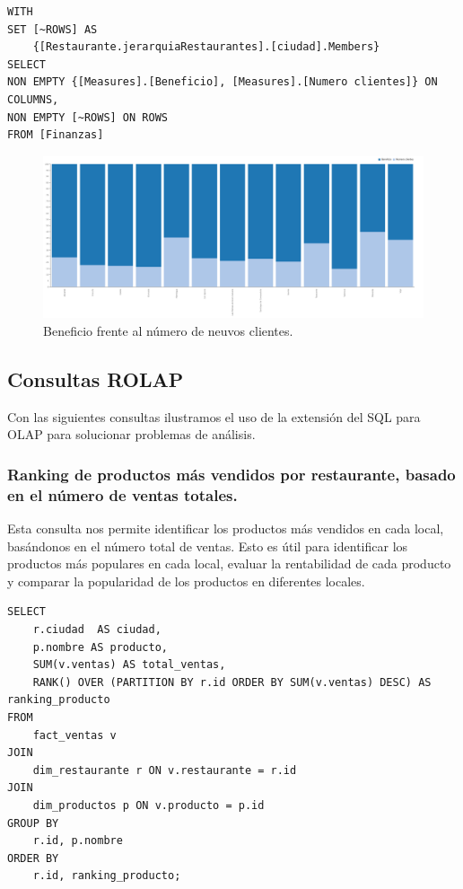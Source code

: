 \documentclass[11pt]{opticajnl}
\begin{document}
\begin{lstlisting}[style=terminal]
WITH
SET [~ROWS] AS
    {[Restaurante.jerarquiaRestaurantes].[ciudad].Members}
SELECT
NON EMPTY {[Measures].[Beneficio], [Measures].[Numero clientes]} ON COLUMNS,
NON EMPTY [~ROWS] ON ROWS
FROM [Finanzas]
\end{lstlisting}

\begin{figure}[H]
    \centering
    \includegraphics[width=\textwidth]{fotos/beneficioVsCliente.png}
    \caption{Beneficio frente al número de neuvos clientes.}
    \label{fig:consulta2}
\end{figure}









\subsection{Consultas ROLAP}

Con las siguientes consultas ilustramos el uso de la extensión del SQL para OLAP para solucionar problemas de análisis.

\subsubsection{Ranking de productos más vendidos por restaurante, basado en el número de ventas totales.}

Esta consulta nos permite identificar los productos más vendidos en cada local, basándonos en el número total de ventas. Esto es útil para identificar los productos más populares en cada local, evaluar la rentabilidad de cada producto y comparar la popularidad de los productos en diferentes locales.

\begin{lstlisting}[style=sql]
SELECT 
    r.ciudad  AS ciudad,
    p.nombre AS producto,
    SUM(v.ventas) AS total_ventas,
    RANK() OVER (PARTITION BY r.id ORDER BY SUM(v.ventas) DESC) AS ranking_producto
FROM 
    fact_ventas v
JOIN 
    dim_restaurante r ON v.restaurante = r.id
JOIN 
    dim_productos p ON v.producto = p.id
GROUP BY 
    r.id, p.nombre
ORDER BY 
    r.id, ranking_producto;
\end{lstlisting}
\end{document}
